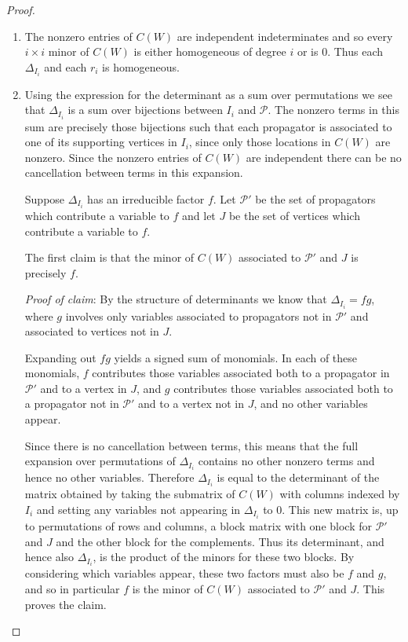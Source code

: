 \documentclass[11pt]{article}
\theoremstyle{remark}
\theoremstyle{definition}
\begin{document}
\begin{proof}
\begin{enumerate}
    \item The nonzero entries of $C(W)$ are independent indeterminates and so every $i\times i$ minor of $C(W)$ is either homogeneous of degree $i$ or is $0$.  Thus each $\Delta_{I_i}$ and each $r_i$ is homogeneous.  %
    \item Using the expression for the determinant as a sum over permutations we see that $\Delta_{I_i}$ is a sum over bijections between $I_i$ and $\mathcal{P}$.  The nonzero terms in this sum are precisely those bijections such that each propagator is associated to one of its supporting vertices in $I_i$, since only those locations in $C(W)$ are nonzero.  Since the nonzero entries of $C(W)$ are independent there can be no cancellation between terms in this expansion.

Suppose $\Delta_{I_i}$ has an irreducible factor $f$.  Let $\mathcal{P}'$ be the set of propagators which contribute a variable to $f$ and let $J$ be the set of vertices which contribute a variable to $f$.

The first claim is that the minor of $C(W)$ associated to $\mathcal{P}'$ and $J$ is precisely $f$.

{\em Proof of claim}: By the structure of determinants we know that $\Delta_{I_i} = fg$, where $g$ involves only variables associated to propagators not in $\mathcal{P}'$ and associated to vertices not in $J$.  

Expanding out $fg$ yields a signed sum of monomials. In each of these monomials, $f$ contributes those variables associated both to a propagator in $\mathcal{P}'$ and to a vertex in $J$, and $g$ contributes those variables associated both to a propagator not in $\mathcal{P}'$ and to a vertex not in $J$, and no other variables appear.  


Since there is no cancellation between terms, this means that the full expansion over permutations of $\Delta_{I_i}$ contains no other nonzero terms and hence no other variables.  Therefore $\Delta_{I_i}$ is equal to the determinant of the matrix obtained by taking the submatrix of $C(W)$ with columns indexed by $I_i$ and setting any variables not appearing in $\Delta_{I_i}$ to $0$.  This new matrix is, up to permutations of rows and columns, a block matrix with one block for $\mathcal{P}'$ and $J$ and the other block for the complements.  Thus its determinant, and hence also $\Delta_{I_i}$, is the product of the minors for these two blocks.  By considering which variables appear, these two factors must also be $f$ and $g$, and so in particular $f$ is the minor of $C(W)$ associated to $\mathcal{P}'$ and $J$.  This proves the claim.


\end{enumerate}
\end{proof}
\end{document}
